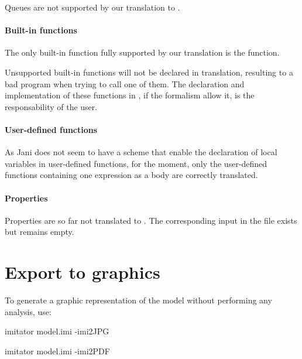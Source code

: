 Queues are not supported by our translation to \jani{}.

\paragraph{Built-in functions}

The only \imitator{} built-in function fully supported by our translation is the  function.

\begin{becareful}
	Unsupported \imitator{} built-in functions will not be declared in \jani{} translation, resulting to a bad program when trying to call one of them. The declaration and implementation of these functions in \jani{}, if the \jani{} formalism allow it, is the responsability of the user.
\end{becareful}

\paragraph{User-defined functions}

As Jani does not seem to have a scheme that enable the declaration of local variables in user-defined functions, for the moment, only the user-defined functions containing one expression as a body are correctly translated.

\paragraph{Properties}
Properties are so far not translated to \jani{}.
The corresponding input in the \jani{} file exists but remains empty.


\section{Export to graphics}

To generate a graphic representation of the \NIPTA{} model without performing any analysis, use:

\begin{terminal}
imitator model.imi -imi2JPG
\end{terminal}

\begin{terminal}
imitator model.imi -imi2PDF
\end{terminal}

